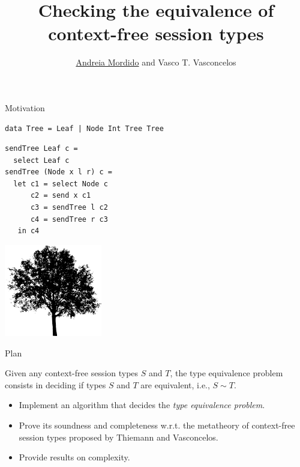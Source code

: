 \documentclass[10pt]{beamer}
\title[Checking the equivalence of context-free session types]{Checking the equivalence of context-free session types}
\date{
\vspace*{1cm}
\begin{center}
	January 2019
\end{center}}
\author[A.Mordido, V.Vasconcelos]{\underline{Andreia Mordido} and Vasco T. Vasconcelos}
\institute[LASIGE, Faculdade de Ci\^encias, ULisboa]{LASIGE, Faculdade de Ci\^encias, Universidade de Lisboa \\\\
}
\begin{document}
\lstset{language=Haskell}

\maketitle

\begin{frame}[fragile]{Motivation}
\vspace*{5mm}

\begin{lstlisting}[language=CFST]
data Tree = Leaf | Node Int Tree Tree
\end{lstlisting}

\begin{lstlisting}[language=CFST]
sendTree Leaf c =
  select Leaf c
sendTree (Node x l r) c =
  let c1 = select Node c
      c2 = send x c1
      c3 = sendTree l c2
      c4 = sendTree r c3
   in c4
\end{lstlisting}
  
\vspace*{-1.8cm}
\hfill \includegraphics[height=4cm]{img/tree}
\end{frame}


\begin{frame}{Plan}

  	\begin{definition} 
    	\smallskip 
    	Given any context-free session types $S$ and $T$, the type equivalence problem consists in deciding if types $S$ and $T$ are equivalent, i.e., $S\sim T$.
  	\end{definition}

  	\begin{itemize}
    	\item Implement an algorithm that decides the \emph{type equivalence problem}.
    	\item Prove its soundness and completeness w.r.t. the metatheory of context-free session types proposed by Thiemann and Vasconcelos.
    	\item Provide results on complexity.
  	\end{itemize}
\end{frame}
\end{document}
